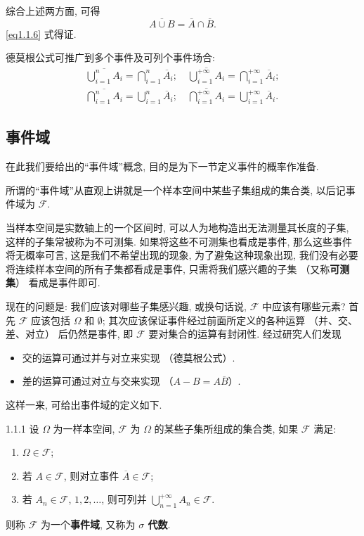 综合上述两方面,
可得
\[
  \overline{A \cup B} = \overline{A} \cap \overline{B}.
\]
\eqref{eq1.1.6} 式得证.

德莫根公式可推广到多个事件及可列个事件场合:
\begin{gather}
  \overline{\bigcup _{i=1} ^n A _i} = \bigcap _{i=1} ^n \overline{A} _i;
  \quad \overline{\bigcup _{i=1} ^{+\infty} A _i} = \bigcap _{i=1} ^{+\infty} \overline{A} _i; \label{eq1.1.8}\\
  \overline{\bigcap _{i=1} ^n A _i} = \bigcup _{i=1} ^n \overline{A} _i;
  \quad \overline{\bigcap _{i=1} ^{+\infty} A _i} = \bigcup _{i=1} ^{+\infty} \overline{A} _i. \label{eq1.1.9}
\end{gather}

\subsection{事件域}

在此我们要给出的“事件域”概念,
目的是为下一节定义事件的概率作准备.

所谓的“事件域”从直观上讲就是一个样本空间中某些子集组成的集合类,
以后记事件域为 $\mathscr{F}$.

当样本空间是实数轴上的一个区间时,
可以人为地构造出无法测量其长度的子集,
这样的子集常被称为不可测集.
如果将这些不可测集也看成是事件,
那么这些事件将无概率可言,
这是我们不希望出现的现象,
为了避兔这种现象出现,
我们没有必要将连续样本空间的所有子集都看成是事件,
只需将我们感兴趣的子集 （又称\textbf{可测集}） 看成是事件即可.

现在的问题是:
我们应该对哪些子集感兴趣,
或换句话说,
$\mathscr{F}$ 中应该有哪些元素?
首先 $\mathscr{F}$ 应该包括 $\Omega$ 和 $\emptyset$;
其次应该保证事件经过前面所定义的各种运算 （并、交、差、对立） 后仍然是事件,
即 $\mathscr{F}$ 要对集合的运算有封闭性.
经过研究人们发现
\begin{itemize}
  \item 交的运算可通过并与对立来实现 （德莫根公式）.
  \item 差的运算可通过对立与交来实现 （$A - B = A\overline{B}$）.
\end{itemize}

这样一来,
可给出事件域的定义如下.


\begin{definition}{}{1.1.1}
  设 $ \Omega $ 为一样本空间,
  $\mathscr{F}$ 为 $\Omega$ 的某些子集所组成的集合类,
  如果 $\mathscr{F}$ 满足:
  \begin{enumerate}
      \item $\Omega \in \mathscr{F}$;
      \item 若 $A \in \mathscr{F}$, 则对立事件 $\overline{A} \in \mathscr{F}$;
      \item 若 $A _n \in \mathscr{F}$, $1,2,\dotsc$, 则可列并 $\bigcup _{n=1} ^{+\infty} A _n \in \mathscr{F}$.
  \end{enumerate}
  则称 $\mathscr{F}$ 为一个\textbf{事件域}, 
  又称为 \textbf{$\sigma$ 代数}. 
\end{definition}

